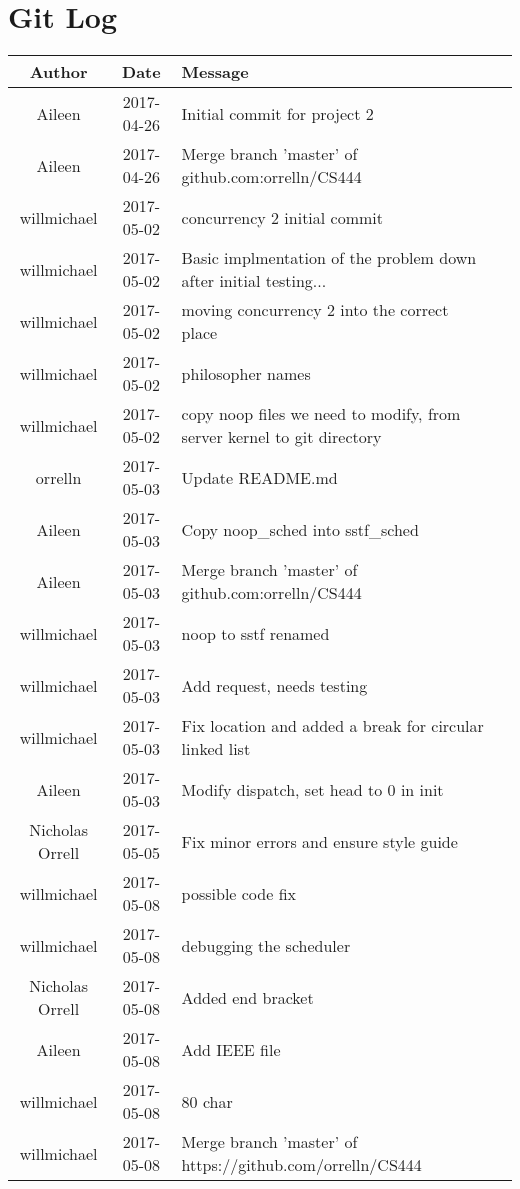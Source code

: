 \documentclass[draftclsnofoot, onecolumn]{IEEEtran}
\begin{document}
\section{Git Log}
\begin{center}
\begin{tabular} { |c|c|l|c|}
    \hline
\bf Author & \bf Date & \bf Message \\ \hline
Aileen & 2017-04-26 & Initial commit for project 2 \\ \hline
Aileen & 2017-04-26 & Merge branch 'master' of github.com:orrelln/CS444 \\ \hline
willmichael & 2017-05-02 & concurrency 2 initial commit \\ \hline
willmichael & 2017-05-02 & Basic implmentation of the problem down after initial testing... \\ \hline
willmichael & 2017-05-02 & moving concurrency 2 into the correct place \\ \hline
willmichael & 2017-05-02 & philosopher names \\ \hline
willmichael & 2017-05-02 & copy noop files we need to modify, from server kernel to git directory \\ \hline
orrelln & 2017-05-03 & Update README.md \\ \hline
Aileen & 2017-05-03 & Copy noop\_sched into sstf\_sched \\ \hline
Aileen & 2017-05-03 & Merge branch 'master' of github.com:orrelln/CS444 \\ \hline
willmichael & 2017-05-03 & noop to sstf renamed \\ \hline
willmichael & 2017-05-03 & Add request, needs testing \\ \hline
willmichael & 2017-05-03 & Fix location and added a break for circular linked list \\ \hline
Aileen & 2017-05-03 & Modify dispatch, set head to 0 in init \\ \hline
Nicholas Orrell & 2017-05-05 & Fix minor errors and ensure style guide \\ \hline
willmichael & 2017-05-08 & possible code fix \\ \hline
willmichael & 2017-05-08 & debugging the scheduler \\ \hline
Nicholas Orrell & 2017-05-08 & Added end bracket \\ \hline
Aileen & 2017-05-08 & Add IEEE file \\ \hline
willmichael & 2017-05-08 & 80 char \\ \hline
willmichael & 2017-05-08 & Merge branch 'master' of https://github.com/orrelln/CS444 \\ \hline

\end{tabular}
\end{center}
\end{document}
